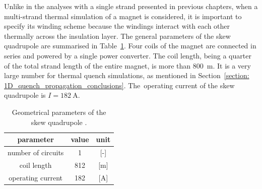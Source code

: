 Unlike in the analyses with a single strand presented in previous chapters, when a multi-strand thermal simulation of a magnet is considered, it is important to specify its winding scheme because the windings interact with each other thermally across the insulation layer. The general parameters of the skew quadrupole are summarised in Table~\ref{table:skew_quad_params_table}. Four coils of the magnet are connected in series and powered by a single power converter. The coil length, being a quarter of the total strand length of the entire magnet, is more than 800~m. It is a very large number for thermal quench simulations, as mentioned in Section~\ref{section: 1D_quench_propagation_conclusions}. The~operating current of the skew quadrupole is $I=182~\text{A}$.

\begin{table}[H]
    \caption{Geometrical parameters of the skew quadrupole \cite{marco_prioli_mails, hl_lhc_tech_design_report_v01}.}
    \vspace{-1.em} 
    \fontsize{10}{10}
    \selectfont 
    \renewcommand{\arraystretch}{1.5}
    \begin{center}
    \begin{tabular}{ ccc }  
    \hline
    parameter & value & unit \\
    \hline
    number of circuits & 1 & [-] \\
    coil length & 812 & [m] \\
    operating current & 182 & [A] \\
    \hline 
    \end{tabular}
    \end{center}  
     \label{table:skew_quad_params_table} 
 \end{table}